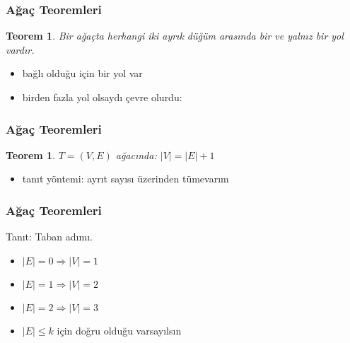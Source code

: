 \documentclass[dvipsnames]{beamer}
\theoremstyle{definition}
\theoremstyle{example}
\theoremstyle{plain}
\newtheorem{teorem}[theorem]{Teorem}
\begin{document}
\begin{frame}
  \frametitle{Ağaç Teoremleri}

  \begin{teorem}
    Bir ağaçta herhangi iki ayrık düğüm arasında bir ve yalnız bir yol vardır.
  \end{teorem}

  \begin{itemize}
    \item bağlı olduğu için bir yol var
    \item birden fazla yol olsaydı çevre olurdu:
    \begin{center}
    \end{center}
  \end{itemize}
\end{frame}

\begin{frame}
  \frametitle{Ağaç Teoremleri}

  \begin{teorem}
    $T = (V, E)$ ağacında: $|V| = |E| + 1$
  \end{teorem}

  \begin{itemize}
    \item tanıt yöntemi: ayrıt sayısı üzerinden tümevarım
  \end{itemize}
\end{frame}

\begin{frame}
  \frametitle{Ağaç Teoremleri}

  \begin{block}{Tanıt: Taban adımı.}
    \begin{itemize}
      \item $|E|=0 \Rightarrow |V|=1$
      \item $|E|=1 \Rightarrow |V|=2$
      \item $|E|=2 \Rightarrow |V|=3$

      \pause
      \medskip
      \item $|E| \leq k$ için doğru olduğu varsayılsın
    \end{itemize}
  \end{block}
\end{frame}
\end{document}

